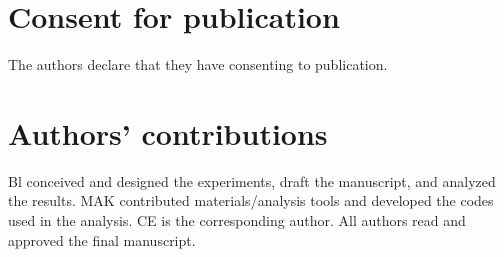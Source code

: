 \documentclass{bmcart}
\begin{document}
\begin{backmatter}
\section*{Consent for publication}%
The authors declare that they have consenting to publication.

\section*{Authors' contributions}
Bl conceived and designed the experiments, draft the manuscript, and analyzed the results. MAK contributed materials/analysis tools and developed the codes used in the analysis. CE is the corresponding author. All authors read and approved the final manuscript.






\end{backmatter}
\end{document}
